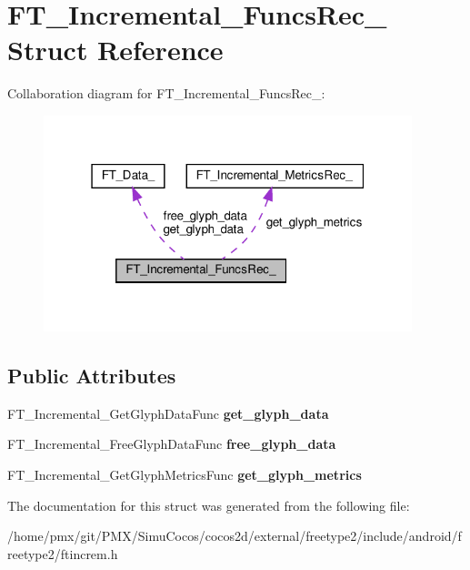 \hypertarget{structFT__Incremental__FuncsRec__}{}\section{F\+T\+\_\+\+Incremental\+\_\+\+Funcs\+Rec\+\_\+ Struct Reference}
\label{structFT__Incremental__FuncsRec__}


Collaboration diagram for F\+T\+\_\+\+Incremental\+\_\+\+Funcs\+Rec\+\_\+\+:
\nopagebreak
\begin{figure}[H]
\begin{center}
\leavevmode
\includegraphics[width=304pt]{structFT__Incremental__FuncsRec____coll__graph}
\end{center}
\end{figure}
\subsection*{Public Attributes}
\begin{DoxyCompactItemize}
\item 
\mbox{\label{structFT__Incremental__FuncsRec___ac276b7ff9624b8d8bf144ab8d00538b4}} 
F\+T\+\_\+\+Incremental\+\_\+\+Get\+Glyph\+Data\+Func {\bfseries get\+\_\+glyph\+\_\+data}
\item 
\mbox{\label{structFT__Incremental__FuncsRec___a9201afcfda8c15be839aee04306dff0a}} 
F\+T\+\_\+\+Incremental\+\_\+\+Free\+Glyph\+Data\+Func {\bfseries free\+\_\+glyph\+\_\+data}
\item 
\mbox{\label{structFT__Incremental__FuncsRec___ac7d95e85357ab9d1893660b0628c1908}} 
F\+T\+\_\+\+Incremental\+\_\+\+Get\+Glyph\+Metrics\+Func {\bfseries get\+\_\+glyph\+\_\+metrics}
\end{DoxyCompactItemize}


The documentation for this struct was generated from the following file\+:\begin{DoxyCompactItemize}
\item 
/home/pmx/git/\+P\+M\+X/\+Simu\+Cocos/cocos2d/external/freetype2/include/android/freetype2/ftincrem.\+h\end{DoxyCompactItemize}
